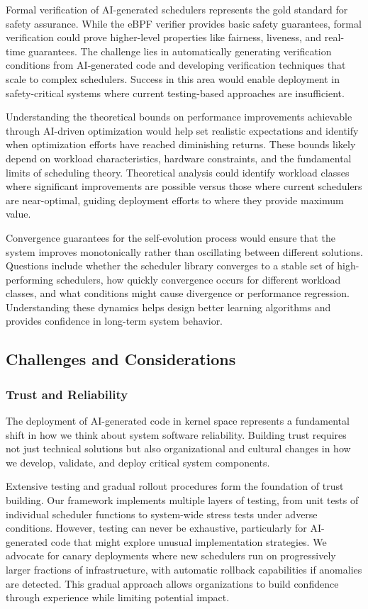 Formal verification of AI-generated schedulers represents the gold standard for safety assurance. While the eBPF verifier provides basic safety guarantees, formal verification could prove higher-level properties like fairness, liveness, and real-time guarantees. The challenge lies in automatically generating verification conditions from AI-generated code and developing verification techniques that scale to complex schedulers. Success in this area would enable deployment in safety-critical systems where current testing-based approaches are insufficient.

Understanding the theoretical bounds on performance improvements achievable through AI-driven optimization would help set realistic expectations and identify when optimization efforts have reached diminishing returns. These bounds likely depend on workload characteristics, hardware constraints, and the fundamental limits of scheduling theory. Theoretical analysis could identify workload classes where significant improvements are possible versus those where current schedulers are near-optimal, guiding deployment efforts to where they provide maximum value.

Convergence guarantees for the self-evolution process would ensure that the system improves monotonically rather than oscillating between different solutions. Questions include whether the scheduler library converges to a stable set of high-performing schedulers, how quickly convergence occurs for different workload classes, and what conditions might cause divergence or performance regression. Understanding these dynamics helps design better learning algorithms and provides confidence in long-term system behavior.

\subsection{Challenges and Considerations}

\subsubsection{Trust and Reliability}
The deployment of AI-generated code in kernel space represents a fundamental shift in how we think about system software reliability. Building trust requires not just technical solutions but also organizational and cultural changes in how we develop, validate, and deploy critical system components.

Extensive testing and gradual rollout procedures form the foundation of trust building. Our framework implements multiple layers of testing, from unit tests of individual scheduler functions to system-wide stress tests under adverse conditions. However, testing can never be exhaustive, particularly for AI-generated code that might explore unusual implementation strategies. We advocate for canary deployments where new schedulers run on progressively larger fractions of infrastructure, with automatic rollback capabilities if anomalies are detected. This gradual approach allows organizations to build confidence through experience while limiting potential impact.

